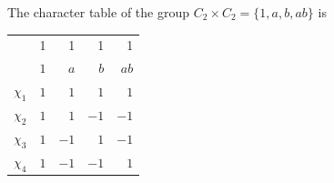 \begin{example}
	The character table of the group $C_2\times C_2=\{1,a,b,ab\}$ is 
	\begin{center}
		\begin{tabular}{|c|rrrr|}
			\hline 
			& 1 & 1 & 1 & 1\tabularnewline
			& $1$ & $a$ & $b$ & $ab$\tabularnewline
			\hline 
			$\chi_{1}$ & $1$ & $1$ & $1$ & $1$\tabularnewline
			$\chi_{2}$ & $1$ & $1$ & $-1$ & $-1$\tabularnewline
			$\chi_{3}$ & $1$ & $-1$ & $1$ & $-1$\tabularnewline
			$\chi_{4}$ & $1$ & $-1$ & $-1$ & $1$\tabularnewline
			\hline
		\end{tabular}
	\end{center}



\end{example}


